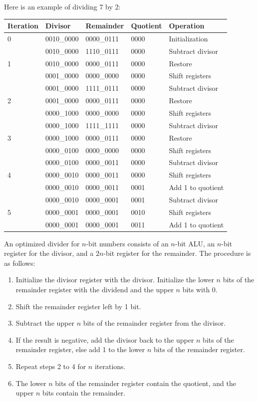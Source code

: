 \documentclass[a4paper,12pt]{article}
\begin{document}
Here is an example of dividing 7 by 2:
\begin{table}[H]
	\centering
	\begin{tabular}{lllll}
		\toprule
		\textbf{Iteration} & \textbf{Divisor} & \textbf{Remainder} & \textbf{Quotient} & \textbf{Operation} \\
		\midrule
		0 & 0010\_0000 & 0000\_0111 & 0000 & Initialization \\
		\midrule
		\multirow{3}{*}{1} & 0010\_0000 & 1110\_0111 & 0000 & Subtract divisor \\
		& 0010\_0000 & 0000\_0111 & 0000 & Restore \\
		& 0001\_0000 & 0000\_0000 & 0000 & Shift registers \\
		\midrule
		\multirow{3}{*}{2} & 0001\_0000 & 1111\_0111 & 0000 & Subtract divisor \\
		& 0001\_0000 & 0000\_0111 & 0000 & Restore \\
		& 0000\_1000 & 0000\_0000 & 0000 & Shift registers \\
		\midrule
		\multirow{3}{*}{3} & 0000\_1000 & 1111\_1111 & 0000 & Subtract divisor \\
		& 0000\_1000 & 0000\_0111 & 0000 & Restore \\
		& 0000\_0100 & 0000\_0000 & 0000 & Shift registers \\
		\midrule
		\multirow{3}{*}{4} & 0000\_0100 & 0000\_0011 & 0000 & Subtract divisor \\
		& 0000\_0010 & 0000\_0011 & 0000 & Shift registers \\
		& 0000\_0010 & 0000\_0011 & 0001 & Add 1 to quotient \\
		\midrule
		\multirow{3}{*}{5} & 0000\_0010 & 0000\_0001 & 0001 & Subtract divisor \\
		& 0000\_0001 & 0000\_0001 & 0010 & Shift registers \\
		& 0000\_0001 & 0000\_0001 & 0011 & Add 1 to quotient \\
		\bottomrule
	\end{tabular}
\end{table}

An optimized divider for $n$-bit numbers consists of an $n$-bit ALU, an $n$-bit register for the divisor, and a $2n$-bit register for the remainder. The procedure is as follows:
\begin{enumerate}
	\item Initialize the divisor register with the divisor. Initialize the lower $n$ bits of the remainder register with the dividend and the upper $n$ bits with 0.
	\item Shift the remainder register left by 1 bit.
	\item Subtract the upper $n$ bits of the remainder register from the divisor.
	\item If the result is negative, add the divisor back to the upper $n$ bits of the remainder register, else add 1 to the lower $n$ bits of the remainder register.
	\item Repeat steps 2 to 4 for $n$ iterations.
	\item The lower $n$ bits of the remainder register contain the quotient, and the upper $n$ bits contain the remainder.
\end{enumerate}
\end{document}
